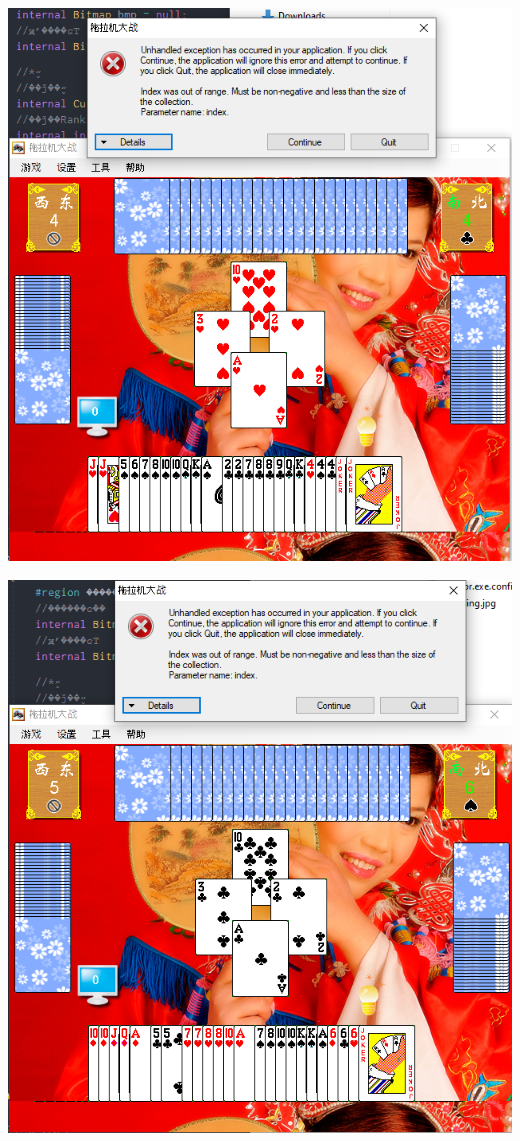 \documentclass[9pt, b5paper]{article}
\begin{document}
\includegraphics[width=.9\linewidth]{./pic/readme_20230510_015324.png}

\includegraphics[width=.9\linewidth]{./pic/readme_20230510_033444.png}
\end{document}

